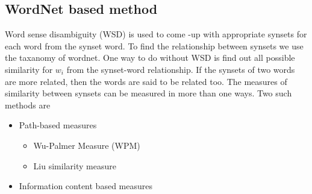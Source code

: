 \documentclass{bmcart}
\begin{document}
\subsection{WordNet based method}
\label{ssec:wordNet}

Word sense disambiguity (WSD) is used to come -up with appropriate synsets for each word from the synset word. To find the relationship between synsets we use the taxanomy of wordnet. One way to do without WSD is find out all possible similarity for $w_i$ from the synset-word relationship. If the synsets of two words are more related, then the words are said to be related too. The measures of similarity between synsets can be measured in more than one ways. Two such methods are 
\begin{itemize}
\item Path-based measures
	\begin{itemize}
	\item Wu-Palmer Measure (WPM)
	\item Liu similarity measure 
	\end{itemize}
\item Information content based measures
\end{itemize}
\end{document}

